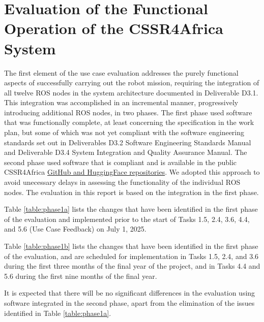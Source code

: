 \documentclass{CSSRforAfrica}
\begin{document}
\section{Evaluation of the Functional Operation of the CSSR4Africa System}
 \label{section:functional_evaluation}

The first element of the use case evaluation addresses the  purely functional aspects of successfully carrying out the robot mission, requiring the integration of all twelve ROS nodes in the system architecture documented in Deliverable D3.1.  This integration was accomplished in an incremental manner, progressively introducing additional ROS nodes, in two phases.  The first phase used software that was functionally complete, at least concerning the specification in the work plan, but some of which was not yet compliant with the software engineering standards set out in Deliverables D3.2 Software Engineering Standards Manual and Deliverable D3.4 System Integration and Quality Assurance Manual.  The second phase used software that is compliant and is available in the public CSSR4Africa \href{https://cssr4africa.github.io/software}{GitHub and HuggingFace repositories}.   We adopted this approach to avoid unecessary delays in assessing the functionality of the individual ROS nodes.  The evaluation in this report is based on the integration in the first phase.  

Table \ref{table:phase1a} lists the  changes that have been identified in the first phase of the evaluation and implemented prior to the start of Tasks  1.5, 2.4, 3.6, 4.4, and 5.6 (Use Case Feedback) on July 1, 2025.

Table \ref{table:phase1b} lists the  changes that have been identified in the first phase of the evaluation, and are scheduled for implementation in Tasks  1.5, 2.4, and 3.6 during the first three months of the final year of the project, and in Tasks 4.4 and 5.6 during the first nine months of the final year.

 It is expected that there will be no significant differences in the evaluation using software integrated in the second phase, apart from the elimination of the issues identified in Table \ref{table:phase1a}.
\end{document}
